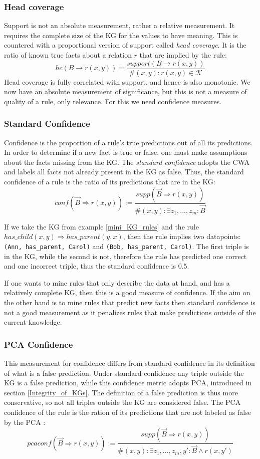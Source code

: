 \subsubsection{Head coverage}
Support is not an absolute measurement, rather a relative measurement. It requires the complete size of the KG for the values to have meaning. This is countered with a proportional version of support called \emph{head coverage}. It is the ratio of known true facts about a relation $r$ that are implied by the rule:
\[hc(B \rightarrow r(x,y)) = \frac{support(B \rightarrow r(x,y))}{\#(x, y) : r(x, y) \in \mathcal{K}}\]
Head coverage is fully correlated with support, and hence is also monotonic. We now have an absolute measurement of significance, but this is not a measure of quality of a rule, only relevance. For this we need confidence measures.


\subsubsection{Standard Confidence} Confidence is the proportion of a rule's true predictions out of all its predictions. In order to determine if a new fact is true or false, one must make assumptions about the facts missing from the KG. The \textit{standard confidence} adopts the CWA and labels all facts not already present in the KG as false. Thus, the standard confidence of a rule is the ratio of its predictions that are in the KG:
\[conf(\vec{B}\Rightarrow r(x, y)) := \frac{supp(\vec{B}\Rightarrow r(x, y))}{\#(x, y):\exists z_1 ,..., z_m : \vec{B}}\]

If we take the KG from example \ref{mini_KG_rules} and the rule $has\_child(x, y) \Rightarrow has\_parent(y, x)$, then the rule implies two datapoints: \texttt{(Ann, has\_parent, Carol)} and \texttt{(Bob, has\_parent, Carol)}. The first triple is in the KG, while the second is not, therefore the rule has predicted one correct and one incorrect triple, thus the standard confidence is 0.5.


If one wants to mine rules that only describe the data at hand, and has a relatively complete KG, then this is a good measure of confidence. If the aim on the other hand is to mine rules that predict new facts then standard confidence is not a good measurement as it penalizes rules that make predictions outside of the current knowledge.


\subsubsection{PCA Confidence}
This measurement for confidence differs from standard confidence in its definition of what is a false prediction. Under standard confidence any triple outside the KG is a false prediction, while this confidence metric adopts PCA, introduced in section \ref{Integrity_of_KGs}. The definition of a false prediction is thus more conservative, so not all triples outside the KG are considered false. The PCA confidence of the rule is the ration of its predictions that are not labeled as false by the PCA \cite{amie}:
\[pcaconf(\vec{B}\Rightarrow r(x, y)) := \frac{supp(\vec{B}\Rightarrow r(x, y))}{\#(x, y):\exists z_1 ,..., z_m, y' : \vec{B} \wedge r(x, y')}\]

